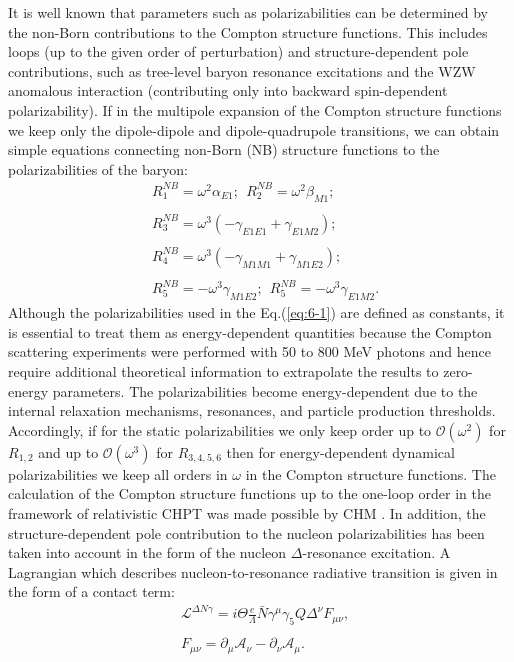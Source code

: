 \documentclass[3p,times,twocolumn]{revtex4}
\begin{document}
It is well known that parameters such as polarizabilities can be determined by 
the non-Born contributions to the Compton structure functions. This includes loops (up to
the given order of perturbation) and structure-dependent pole contributions,
such as tree-level baryon resonance excitations and the WZW anomalous
interaction (contributing only into backward spin-dependent polarizability).
If in the multipole expansion of the Compton structure functions \cite{multi-1,multi-2,multi-3}
we keep only the dipole-dipole and dipole-quadrupole transitions,
we can obtain simple equations connecting non-Born (NB) structure
functions to the polarizabilities of the baryon: 
\begin{eqnarray}
&R_{1}^{NB}=\omega^{2}\alpha_{E1};\ \ R_{2}^{NB}=\omega^{2}\beta_{M1}; \nonumber \\ \nonumber \\
&R_{3}^{NB}=\omega^{3}(-\gamma_{E1E1}+\gamma_{E1M2}); \nonumber \\ \nonumber \\
&R_{4}^{NB}=\omega^{3}(-\gamma_{M1M1}+\gamma_{M1E2});\nonumber \\ \nonumber \\
&R_{5}^{NB}=-\omega^{3}\gamma_{M1E2};\ \ R_{5}^{NB}=-\omega^{3}\gamma_{E1M2}.\label{eq:6-1}
\end{eqnarray}
Although the polarizabilities used in the Eq.(\ref{eq:6-1}) are defined
as constants, it is essential to treat them as energy-dependent quantities
\cite{Griesshammer} because the
Compton scattering experiments were performed with 50 to 800 MeV photons
and hence require additional theoretical information to extrapolate
the results to zero-energy parameters. The
polarizabilities become energy-dependent due to the internal relaxation
mechanisms, resonances, and particle production thresholds. Accordingly,
if for the static polarizabilities we only keep order up to $\mathcal{O}(\omega^{2})$
for $R_{1,2}$ and up to $\mathcal{O}(\omega^{3})$ for $R_{3,4,5,6}$ then
for energy-dependent dynamical polarizabilities we keep all orders
in $\omega$ in the Compton structure functions. The calculation of the Compton structure
functions up to the one-loop order in the framework of relativistic
CHPT was made possible by CHM \cite{CHM}.
In addition, the structure-dependent pole contribution to the nucleon
polarizabilities has been taken into account in the form of the nucleon
$\Delta$-resonance excitation. A Lagrangian which describes nucleon-to-resonance
radiative transition is given in the form of a contact term:
\begin{eqnarray}
 & \displaystyle{\mathcal{L}^{\Delta N\gamma}=i\Theta\frac{e}{\Lambda}\bar{N}\gamma^{\mu}\gamma_{5}Q\Delta^{\nu}F_{\mu\nu},}\nonumber \\
\label{eq:9-1}\\
 & F_{\mu\nu}=\partial_{\mu}\mathcal{A}_{\nu}-\partial_{\nu}\mathcal{A}_{\mu}.\nonumber 
\end{eqnarray}
\end{document}
